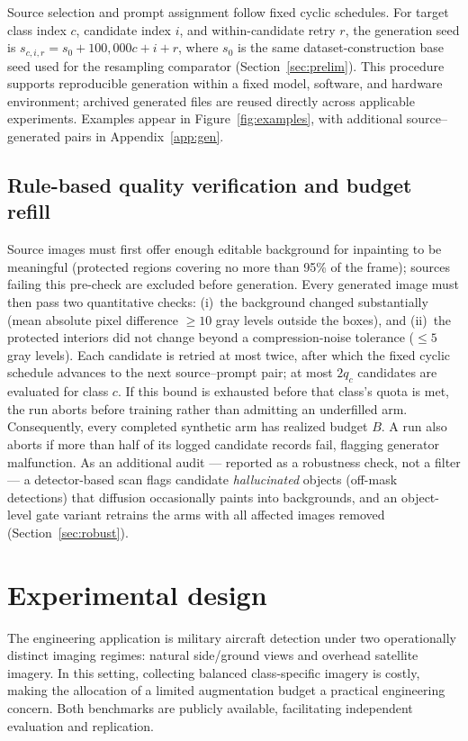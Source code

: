 \documentclass[preprint,12pt,authoryear]{elsarticle}
\begin{document}
Source selection and prompt assignment follow fixed cyclic schedules.
For target class index $c$, candidate index $i$, and within-candidate
retry $r$, the generation seed is
$s_{c,i,r}=s_0+100{,}000c+i+r$, where $s_0$ is the same
dataset-construction base seed used for the resampling comparator
(Section~\ref{sec:prelim}). This procedure supports reproducible
generation within a fixed model, software, and hardware environment;
archived generated files are reused directly across applicable
experiments. Examples appear in Figure~\ref{fig:examples}, with
additional source--generated pairs in Appendix~\ref{app:gen}.

\subsection{Rule-based quality verification and budget refill}\label{sec:verify}

Source images must first offer enough editable background for inpainting
to be meaningful (protected regions covering no more than 95\% of the
frame); sources failing this pre-check are excluded before generation.
Every generated image must then pass two quantitative checks: (i)~the
background changed substantially (mean absolute pixel difference $\geq
10$ gray levels outside the boxes), and (ii)~the protected interiors did
not change beyond a compression-noise tolerance ($\leq 5$ gray levels).
Each candidate is retried at most twice, after which the fixed cyclic
schedule advances to the next source--prompt pair; at most $2q_c$
candidates are evaluated for class $c$. If this bound is exhausted
before that class's quota is met, the run aborts before training rather
than admitting an underfilled arm. Consequently, every completed
synthetic arm has realized budget $B$. A run also aborts if more than
half of its logged candidate records fail, flagging generator
malfunction. As an additional audit --- reported as a robustness check,
not a filter --- a detector-based scan flags candidate
\emph{hallucinated} objects (off-mask detections) that diffusion
occasionally paints into backgrounds, and an
object-level gate variant retrains the arms with all affected images
removed (Section~\ref{sec:robust}).

\section{Experimental design}\label{sec:design}

The engineering application is military aircraft detection under two
operationally distinct imaging regimes: natural side/ground views and
overhead satellite imagery. In this setting, collecting balanced
class-specific imagery is costly, making the allocation of a limited
augmentation budget a practical engineering concern. Both benchmarks
are publicly available, facilitating independent evaluation and
replication.
\end{document}
